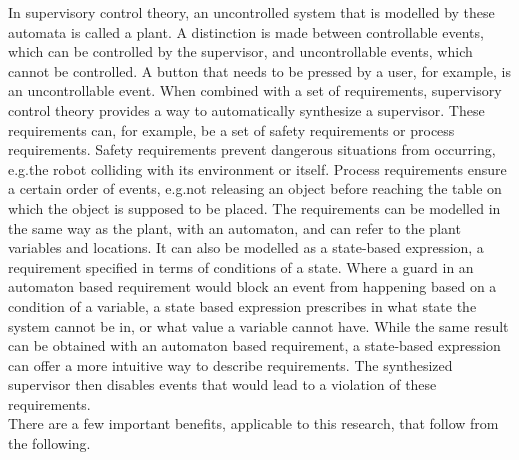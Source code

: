 In supervisory control theory, an uncontrolled system that is modelled by these automata is called a plant. 
A distinction is made between controllable events, which can be controlled by the supervisor, and uncontrollable events, which cannot be controlled.
A button that needs to be pressed by a user, for example, is an uncontrollable event.
When combined with a set of requirements, supervisory control theory provides a way to automatically synthesize a supervisor.
These requirements can, for example, be a set of safety requirements or process requirements.
Safety requirements prevent dangerous situations from occurring, e.g.\@ the robot colliding with its environment or itself.
Process requirements ensure a certain order of events, e.g.\@ not releasing an object before reaching the table on which the object is supposed to be placed.
The requirements can be modelled in the same way as the plant, with an automaton, and can refer to the plant variables and locations.
It can also be modelled as a state-based expression, a requirement specified in terms of conditions of a state.
Where a guard in an automaton based requirement would block an event from happening based on a condition of a variable, a state based expression prescribes in what state the system cannot be in, or what value a variable cannot have.
While the same result can be obtained with an automaton based requirement, a state-based expression can offer a more intuitive way to describe requirements.  
The synthesized supervisor then disables events that would lead to a violation of these requirements.\\

There are a few important benefits, applicable to this research, that follow from the following.\\


